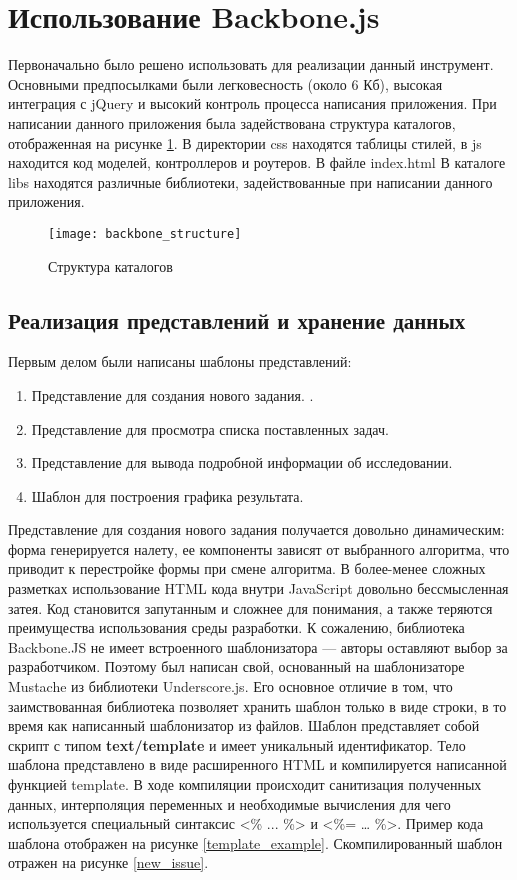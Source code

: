 \section{Использование Backbone.js}

Первоначально было решено использовать для реализации данный инструмент. Основными предпосылками были легковесность (около 6 Кб), высокая интеграция с jQuery и высокий контроль процесса написания приложения. При написании данного приложения была задействована структура каталогов, отображенная на рисунке \ref{backbone_structure}. В директории css находятся таблицы стилей, в js находится код моделей, контроллеров и роутеров. В файле index.html  В каталоге libs находятся различные библиотеки, задействованные при написании данного приложения.

\begin{figure}[h]
\center\texttt{[image: backbone\_structure]}
\caption{Структура каталогов}\label{backbone_structure}
\end{figure}

\subsection{Реализация представлений и хранение данных}

Первым делом были написаны шаблоны представлений:

\begin{enumerate}
 \item Представление для создания нового задания. .
 \item Представление для просмотра списка поставленных задач.
 \item Представление для вывода подробной информации об исследовании.
 \item Шаблон для построения графика результата.
\end{enumerate}

Представление для создания нового задания получается довольно динамическим: форма генерируется налету, ее компоненты зависят от выбранного алгоритма, что приводит к перестройке формы при смене алгоритма. В более-менее сложных разметках использование HTML кода внутри JavaScript довольно бессмысленная затея. Код становится запутанным и сложнее для понимания, а также теряются преимущества использования среды разработки. К сожалению, библиотека Backbone.JS не имеет встроенного шаблонизатора --- авторы оставляют выбор за разработчиком. Поэтому был написан свой, основанный на шаблонизаторе Mustache из библиотеки Underscore.js. Его основное отличие в том, что заимствованная библиотека позволяет хранить шаблон только в виде строки, в то время как написанный шаблонизатор из файлов. Шаблон представляет собой скрипт с типом \textbf{text/template} и имеет уникальный идентификатор. Тело шаблона представлено в виде расширенного HTML и компилируется написанной функцией template. В ходе компиляции происходит санитизация полученных данных, интерполяция переменных и необходимые вычисления для чего используется специальный синтаксис <\% ... \%> и <\%= … \%>. Пример кода шаблона отображен на рисунке \ref{template_example}. Скомпилированный шаблон отражен на рисунке \ref{new_issue}.

